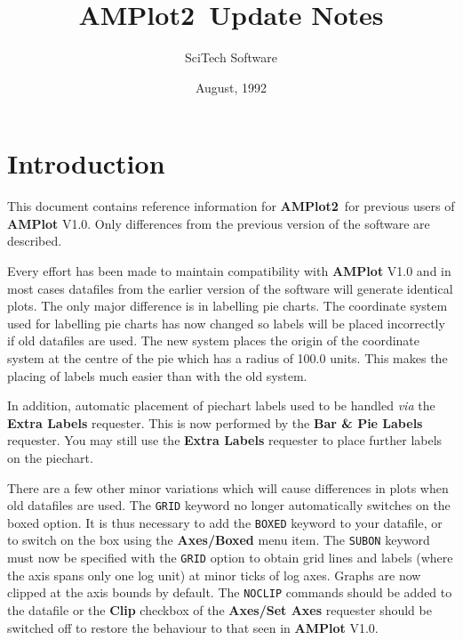 
\newcommand{\amplot}{{\bf AMPlot2}}
\newcommand{\RA}[1]{\mbox{{\em Right-Amiga}--{\bf #1}}}
\newcommand{\degree}{\mbox{$\mbox{}^\circ$}}


\title{\amplot\ Update Notes}
\author{{\sf SciTech Software}}
\date{August, 1992}


\maketitle

\chapter{Introduction}
This document contains reference information for \amplot\ for previous users of
{\bf AMPlot} V1.0. Only differences from the previous version of the software are
described.

Every effort has been made to maintain compatibility with {\bf AMPlot} V1.0 and in
most cases datafiles from the earlier version of the software will generate 
identical plots. The only major difference is in labelling pie charts. The 
coordinate system used for labelling pie charts has now changed so labels will be 
placed incorrectly if old datafiles are used. The new system places the origin of 
the coordinate system at the centre of the pie which has a radius of 100.0 units. 
This makes the placing of labels much easier than with the old system.

In addition, automatic placement of piechart labels used to be handled {\em via\/}
the {\bf Extra Labels} requester. This is now performed by the {\bf Bar \& Pie Labels}
requester. You may still use the {\bf Extra Labels} requester to place further
labels on the piechart.

There are a few other minor variations which will cause differences in plots when
old datafiles are used.
The {\tt GRID} keyword no longer automatically switches on the boxed option. It is
thus necessary to add the {\tt BOXED} keyword to your datafile, or to switch on the
box using the {\bf Axes/Boxed} menu item.
The {\tt SUBON} keyword must now be specified with the {\tt GRID} option to obtain 
grid lines and labels (where the axis spans only one log unit) at minor ticks of 
log axes. Graphs are now clipped at the axis bounds by default. The {\tt NOCLIP} 
commands should be added to the datafile or the {\bf Clip} checkbox of the {\bf 
Axes/Set Axes} requester should be switched  off to restore the behaviour to that 
seen in {\bf AMPlot} V1.0.


